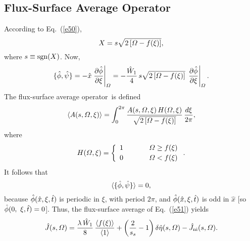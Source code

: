 \documentclass[12pt,prb,aps]{revtex4-1}
\begin{document}
\subsection{Flux-Surface Average Operator}
According to Eq.~(\ref{e50}), 
\begin{equation}
X = s\sqrt{2\left[{\mit\Omega}-f(\xi)\right]},
\end{equation}
where $s\equiv {\rm sgn}(X)$. Now,
\begin{equation}
 \{\skew{3}\hat{\phi},\hat{\psi}\} = -\hat{x}\left.\frac{\partial\hat{\phi}}{\partial\xi}\right|_{\mit\Omega}= -\frac{\hat{W}_1}{4}\,
 s\sqrt{2\left[{\mit\Omega}-f(\xi)\right]}\,\left.\frac{\partial\hat{\phi}}{\partial\xi}\right|_{\mit\Omega}.
 \end{equation}
 The  flux-surface average operator\,\cite{ruth} is defined
 \begin{equation}\label{e54}
 \langle A(s,{\mit\Omega},\xi)\rangle= \int_{0}^{2\pi}\frac{A(s,{\mit\Omega},\xi)\,H({\mit\Omega},\xi)}
 {\sqrt{2\left[{\mit\Omega}-f(\xi)\right]}}\,\frac{d\xi}{2\pi},
 \end{equation}
 where
 \begin{equation}\label{e55}
 H({\mit\Omega},\xi) = \left\{
 \begin{array}{ccc} 1&~~~~~&{\mit\Omega}\geq f(\xi)\\[0.5ex]
 0 &&{\mit\Omega}< f(\xi)\end{array}\right..
 \end{equation}
 It follows that
 \begin{equation}
 \langle \{\skew{3}\hat{\phi},\hat{\psi}\}\rangle = 0,
 \end{equation}
 because $\skew{3}\hat{\phi}(\hat{x},\xi,\hat{t})$ is periodic in $\xi$, with period $2\pi$, and $\skew{3}\hat{\phi}(\hat{x},\xi,\hat{t})$
 is odd in $\hat{x}$ [so $\skew{3}\hat{\phi}(0,\
 \xi,\hat{t})=0$]. Thus, the flux-surface average of Eq.~(\ref{e51}) yields
 \begin{equation}\label{e57}
 \hat{J}(s,{\mit\Omega}) = \frac{\lambda\,\hat{W}_1}{8}\,\frac{\langle f(\xi)\rangle}{\langle 1\rangle} +\left(\frac{2}{s_s}-1\right)\delta\hat{\eta}(s,{\mit\Omega}) - \hat{J}_{\rm ni}(s,{\mit\Omega}).
 \end{equation}
\end{document}

